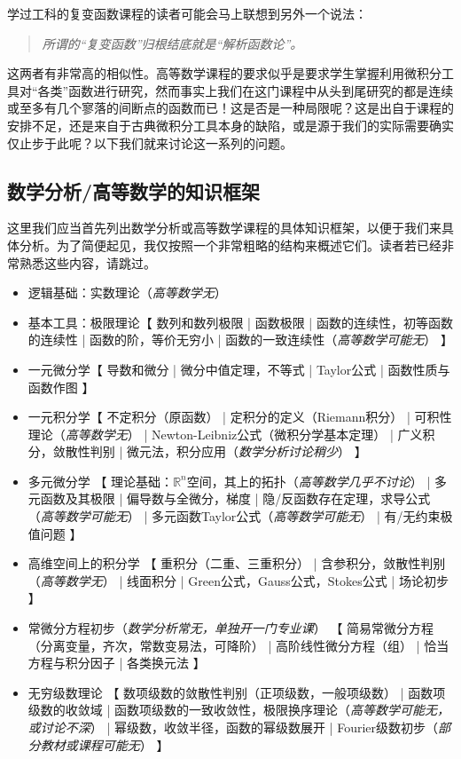 \documentclass[12pt,a4paper]{article}
\begin{document}
{		学过工科的复变函数课程的读者可能会马上联想到另外一个说法：
		\begin{quote}\itshape
			所谓的“复变函数”归根结底就是“解析函数论”。
		\end{quote}
		
		这两者有非常高的相似性。高等数学课程的要求似乎是要求学生掌握利用微积分工具对“各类”函数进行研究，然而事实上我们在这门课程中从头到尾研究的都是连续或至多有几个寥落的间断点的函数而已！这是否是一种局限呢？这是出自于课程的安排不足，还是来自于古典微积分工具本身的缺陷，或是源于我们的实际需要确实仅止步于此呢？以下我们就来讨论这一系列的问题。
		\subsection{数学分析/高等数学的知识框架}{
			这里我们应当首先列出数学分析或高等数学课程的具体知识框架，以便于我们来具体分析。为了简便起见，我仅按照一个非常粗略的结构来概述它们。读者若已经非常熟悉这些内容，请跳过。
			\begin{itemize}
				\item 逻辑基础：实数理论（{\slshape 高等数学无}）
				\item 基本工具：极限理论【 数列和数列极限 | 函数极限 | 函数的连续性，初等函数的连续性 | 函数的阶，等价无穷小 | 函数的一致连续性（{\slshape 高等数学可能无}） 】
				\item 一元微分学【 导数和微分 | 微分中值定理，不等式 | Taylor公式 | 函数性质与函数作图 】
				\item 一元积分学【 不定积分（原函数） | 定积分的定义（Riemann积分） | 可积性理论（{\slshape 高等数学无}） | Newton-Leibniz公式（微积分学基本定理） | 广义积分，敛散性判别 | 微元法，积分应用（{\slshape 数学分析讨论稍少}） 】
				\item 多元微分学 【 理论基础：$\mathbb{R}^n$空间，其上的拓扑（{\slshape 高等数学几乎不讨论}） | 多元函数及其极限 | 偏导数与全微分，梯度 | 隐/反函数存在定理，求导公式（{\slshape 高等数学可能无}） | 多元函数Taylor公式（{\slshape 高等数学可能无}） | 有/无约束极值问题 】
				\item 高维空间上的积分学 【 重积分（二重、三重积分） | 含参积分，敛散性判别（{\slshape 高等数学无}） | 线面积分 | Green公式，Gauss公式，Stokes公式 | 场论初步 】
				\item 常微分方程初步（{\slshape 数学分析常无，单独开一门专业课}） 【 简易常微分方程（分离变量，齐次，常数变易法，可降阶） | 高阶线性微分方程（组） | 恰当方程与积分因子 | 各类换元法 】
				\item 无穷级数理论 【 数项级数的敛散性判别（正项级数，一般项级数） | 函数项级数的收敛域 | 函数项级数的一致收敛性，极限换序理论（{\slshape 高等数学可能无，或讨论不深}） | 幂级数，收敛半径，函数的幂级数展开 | Fourier级数初步（{\slshape 部分教材或课程可能无}） 】
				

\end{itemize}}}
\end{document}
